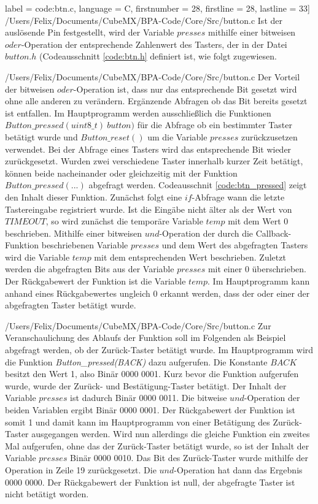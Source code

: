 label = code:btn.c, 
language = C, 
firstnumber = 28, 
firstline = 28, 
lastline = 33]
{/Users/Felix/Documents/CubeMX/BPA-Code/Core/Src/button.c}
Ist der auslösende Pin festgestellt, wird der Variable $presses$ mithilfe einer bitweisen $oder$-Operation der entsprechende Zahlenwert des Tasters, der in der Datei $button.h$ (Codeausschnitt \ref{code:btn.h} definiert ist, wie folgt zugewiesen.

{/Users/Felix/Documents/CubeMX/BPA-Code/Core/Src/button.c}
Der Vorteil der bitweisen $oder$-Operation ist, dass nur das entsprechende Bit gesetzt wird ohne alle anderen zu verändern. Ergänzende Abfragen ob das Bit bereits gesetzt ist entfallen.
Im Hauptprogramm werden ausschließlich die Funktionen $Button\_pressed(uint8\_t)\ button)$ für die Abfrage ob ein bestimmter Taster betätigt wurde und $Button\_reset()$ um die Variable $presses$ zurückzusetzen verwendet. Bei der Abfrage eines Tasters wird das entsprechende Bit wieder zurückgesetzt. Wurden zwei verschiedene Taster innerhalb kurzer Zeit betätigt, können beide nacheinander oder gleichzeitig mit der Funktion $Button\_pressed(...)$ abgefragt werden. Codeausschnit \ref{code:btn_pressed} zeigt den Inhalt dieser Funktion. Zunächst folgt eine $if$-Abfrage wann die letzte Tastereingabe registriert wurde. Ist die Eingäbe nicht älter als der Wert von $TIMEOUT$, so wird zunächst die temporäre Variable $temp$ mit dem Wert 0 beschrieben. Mithilfe einer bitweisen $und$-Operation der durch die Callback-Funktion beschriebenen Variable $presses$ und dem Wert des abgefragten Tasters wird die Variable $temp$ mit dem entsprechenden Wert beschrieben. Zuletzt werden die abgefragten Bits aus der Variable $presses$ mit einer $0$ überschrieben. Der Rückgabewert der Funktion ist die Variable $temp$. Im Hauptprogramm kann anhand eines Rückgabewertes ungleich $0$ erkannt werden, dass der oder einer der abgefragten Taster betätigt wurde.

{/Users/Felix/Documents/CubeMX/BPA-Code/Core/Src/button.c}
Zur Veranschaulichung des Ablaufs der Funktion soll im Folgenden als Beispiel abgefragt werden, ob der Zurück-Taster betätigt wurde. Im Hauptprogramm wird die Funktion \textit{Button\_pressed(BACK)} dazu aufgerufen. Die Konstante $BACK$ besitzt den Wert 1, also Binär 0000 0001. Kurz bevor die Funktion aufgerufen wurde, wurde der Zurück- und Bestätigung-Taster betätigt. Der Inhalt der Variable $presses$ ist dadurch Binär 0000 0011. Die bitweise $und$-Operation der beiden Variablen ergibt Binär 0000 0001. Der Rückgabewert der Funktion ist somit 1 und damit kann im Hauptprogramm von einer Betätigung des Zurück-Taster ausgegangen werden. Wird nun allerdings die gleiche Funktion ein zweites Mal aufgerufen, ohne das der Zurück-Taster betätigt wurde, so ist der Inhalt der Variable $presses$ Binär 0000 0010. Das Bit des Zurück-Taster wurde mithilfe der Operation in Zeile 19 zurückgesetzt. Die $und$-Operation hat dann das Ergebnis 0000 0000. Der Rückgabewert der Funktion ist null, der abgefragte Taster ist nicht betätigt worden.
